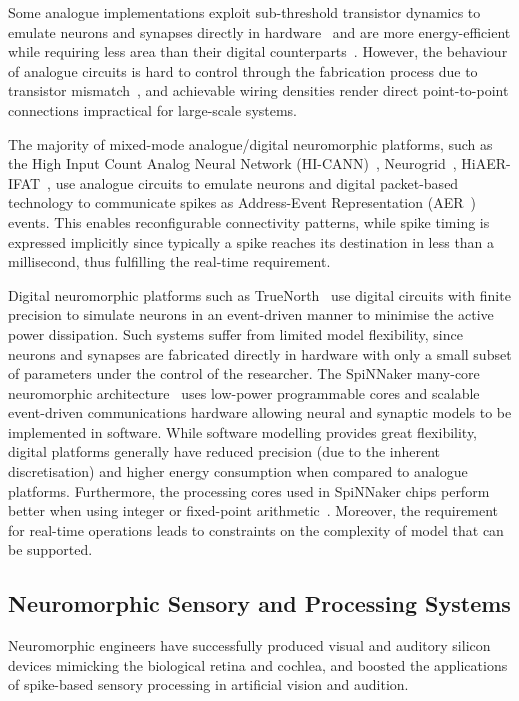 Some analogue implementations exploit sub-threshold transistor dynamics to emulate neurons and synapses directly in hardware~\cite{indiveri2011neuromorphic} and are more energy-efficient while requiring less area than their digital counterparts~\cite{joubert2012hardware}.
However, the behaviour of analogue circuits is hard to control through the fabrication process due to transistor mismatch~\cite{indiveri2011neuromorphic,pedram2006thermal,linares2003compact}, and achievable wiring densities render direct point-to-point connections impractical for large-scale systems.

The majority of mixed-mode analogue/digital neuromorphic platforms, such as the High Input Count Analog Neural Network (HI-CANN)~\cite{schemmel2010wafer}, Neurogrid~\cite{benjamin2014neurogrid}, HiAER-IFAT~\cite{yu201265k}, use analogue circuits to emulate neurons and digital packet-based technology to communicate spikes as Address-Event Representation (AER~\cite{lazzaro1995multi}) events.
This enables reconfigurable connectivity patterns, while spike timing is expressed implicitly since typically a spike reaches its destination in less than a millisecond, thus fulfilling the real-time requirement.

Digital neuromorphic platforms such as TrueNorth~\cite{merolla2014million} use digital circuits with finite precision to simulate neurons in an event-driven manner to minimise the active power dissipation.
Such systems suffer from limited model flexibility, since neurons and synapses are fabricated directly in hardware with only a small subset of parameters under the control of the researcher.
The SpiNNaker many-core neuromorphic architecture~\cite{furber2014spinnaker} uses low-power programmable cores and scalable event-driven communications hardware allowing neural and synaptic models to be implemented in software.
While software modelling provides great flexibility, digital platforms generally have reduced precision (due to the inherent discretisation) and higher energy consumption when compared to analogue platforms.
Furthermore, the processing cores used in SpiNNaker chips perform better when using integer or fixed-point arithmetic~\cite{Hopkins2015Accuracy}.
Moreover, the requirement for real-time operations leads to constraints on the complexity of model that can be supported.

\subsection{Neuromorphic Sensory and Processing Systems}
\label{sec:morph}
Neuromorphic engineers have successfully produced visual and auditory silicon devices mimicking the biological retina and cochlea, and boosted the applications of spike-based sensory processing in artificial vision and audition.

